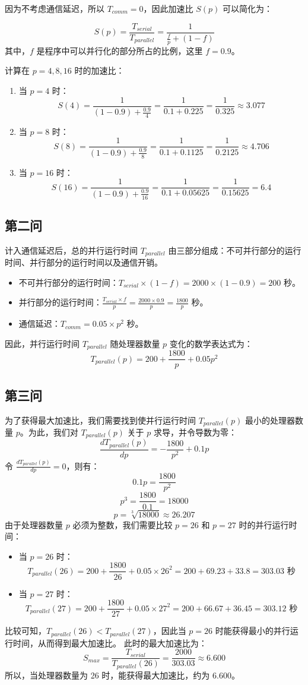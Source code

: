 因为不考虑通信延迟，所以 $T_{comm}=0$，因此加速比 $S(p)$ 可以简化为：

$$ S(p) = \frac{T_{serial}}{T_{parallel}} =\frac{1} {\frac{f}{p} + (1-f)}$$
其中，$f$ 是程序中可以并行化的部分所占的比例，这里 $f=0.9$。

计算在 $p=4,8,16$ 时的加速比：
\begin{enumerate}
    \item 当 $p=4$ 时：
    $$ S(4) = \frac{1}{(1-0.9) + \frac{0.9}{4}} = \frac{1}{0.1 + 0.225} = \frac{1}{0.325} \approx 3.077 $$
    \item 当 $p=8$ 时：
    $$ S(8) = \frac{1}{(1-0.9) + \frac{0.9}{8}} = \frac{1}{0.1 + 0.1125} = \frac{1}{0.2125} \approx 4.706 $$
    \item 当 $p=16$ 时：
    $$ S(16) = \frac{1}{(1-0.9) + \frac{0.9}{16}} = \frac{1}{0.1 + 0.05625} = \frac{1}{0.15625} = 6.4 $$
\end{enumerate}

\subsection{第二问}
计入通信延迟后，总的并行运行时间 $T_{parallel}$ 由三部分组成：不可并行部分的运行时间、并行部分的运行时间以及通信开销。
\begin{itemize}
    \item 不可并行部分的运行时间：$T_{serial} \times (1-f) = 2000 \times (1-0.9) = 200$ 秒。
    \item 并行部分的运行时间：$\frac{T_{serial} \times f}{p} = \frac{2000 \times 0.9}{p} = \frac{1800}{p}$ 秒。
    \item 通信延迟：$T_{comm} = 0.05 \times p^2$ 秒。
\end{itemize}
因此，并行运行时间 $T_{parallel}$ 随处理器数量 $p$ 变化的数学表达式为：
$$ T_{parallel}(p) = 200 + \frac{1800}{p} + 0.05 p^2 $$

\subsection{第三问}
为了获得最大加速比，我们需要找到使并行运行时间 $T_{parallel}(p)$ 最小的处理器数量 $p$。为此，我们对 $T_{parallel}(p)$ 关于 $p$ 求导，并令导数为零：
$$ \frac{d T_{parallel}(p)}{dp} = -\frac{1800}{p^2} + 0.1 p $$
令 $\frac{d T_{parallel}(p)}{dp} = 0$，则有：
$$ 0.1 p = \frac{1800}{p^2} $$
$$ p^3 = \frac{1800}{0.1} = 18000 $$
$$ p = \sqrt[3]{18000} \approx 26.207 $$
由于处理器数量 $p$ 必须为整数，我们需要比较 $p=26$ 和 $p=27$ 时的并行运行时间：
\begin{itemize}
    \item 当 $p=26$ 时：
    $$ T_{parallel}(26) = 200 + \frac{1800}{26} + 0.05 \times 26^2 = 200 + 69.23 + 33.8 = 303.03 \text{ 秒} $$
    \item 当 $p=27$ 时：
    $$ T_{parallel}(27) = 200 + \frac{1800}{27} + 0.05 \times 27^2 = 200 + 66.67 + 36.45 = 303.12 \text{ 秒} $$
\end{itemize}
比较可知，$T_{parallel}(26) < T_{parallel}(27)$，因此当 $p=26$ 时能获得最小的并行运行时间，从而得到最大加速比。
此时的最大加速比为：
$$ S_{max} = \frac{T_{serial}}{T_{parallel}(26)} = \frac{2000}{303.03} \approx 6.600 $$
所以，当处理器数量为 26 时，能获得最大加速比，约为 6.600。


